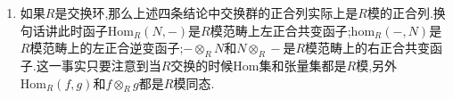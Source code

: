 \begin{enumerate}
\begin{proof}
\begin{enumerate}
			现在构造逆.先构造双线性映射$s:M\times C\to(M\otimes_RB)/E$为,对任意$(m,c)$,从$g$满射知存在$b\in B$使得$g(b)=c$,就定义$f(m,c)=m\otimes b+E$.需要说明这个定义良性,倘若还存在$b'\in B$使得$g(b')=c$,那么$b-b'\in\ker g=\mathrm{im}f$,于是存在$a\in A$使得$f(a)=b-b'$,那么$m\otimes(b-b')+E=(1_M\otimes f)(m\otimes a)+E=E$,这说明定义良性.验证它是双线性型,于是张量积的泛映射性质说明这诱导了模同态$s^*:M\otimes_RC\to(M\otimes_RB)/E$,验证它和之前的同态互为逆映射,这就完成证明.
		\end{enumerate}    
	\end{proof}
	\item 如果$R$是交换环,那么上述四条结论中交换群的正合列实际上是$R$模的正合列.换句话讲此时函子$\mathrm{Hom}_R(N,-)$是$R$模范畴上左正合共变函子;$\mathrm{hom}_R(-,N)$是$R$模范畴上的左正合逆变函子;$-\otimes_RN$和$N\otimes_R-$是$R$模范畴上的右正合共变函子.这一事实只要注意到当$R$交换的时候Hom集和张量集都是$R$模,另外$\mathrm{Hom}_R(f,g)$和$f\otimes_R g$都是$R$模同态.
\end{enumerate}

